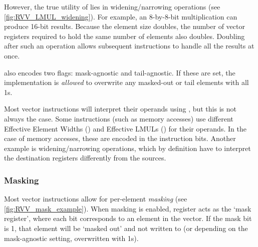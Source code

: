 
However, the true utility of  lies in widening/narrowing operations (see \cref{fig:RVV_LMUL_widening}).
For example, an 8-by-8-bit multiplication can produce 16-bit results.
Because the element size doubles, the number of vector registers required to hold the same number of elements also doubles.
Doubling  after such an operation allows subsequent instructions to handle all the results at once.

 also encodes two flags: mask-agnostic and tail-agnostic.
If these are set, the implementation is \emph{allowed} to overwrite any masked-out or tail elements with all 1s.

Most vector instructions will interpret their operands using , but this is not always the case.
Some instructions (such as memory accesses) use different Effective Element Widths () and Effective LMULs () for their operands.
In the case of memory accesses, these are encoded in the instruction bits.
Another example is widening/narrowing operations, which by definition have to interpret the destination registers differently from the sources.

\pagebreak
{}
\subsubsection{Masking}
Most vector instructions allow for per-element \emph{masking} (see \cref{fig:RVV_mask_example}).
When masking is enabled, register  acts as the `mask register', where each bit corresponds to an element in the vector.
If the mask bit is 1, that element will be `masked out' and not written to (or depending on the mask-agnostic setting, overwritten with 1s).


